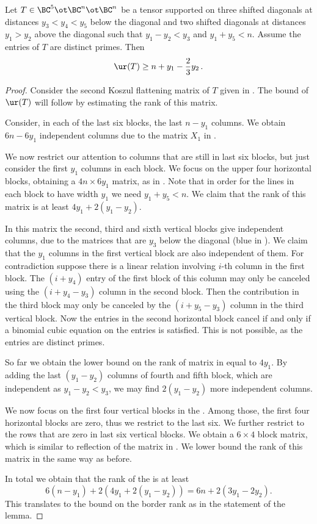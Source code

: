 \documentclass{toc}
\begin{document}
\begin{lemma}\label{primecase}
Let $T\in \BC^5\ot \BC^{n}\ot \BC^{n}$ be a tensor supported on 
three 
%
shifted 
diagonals at distances $y_3<y_4<y_5$ below the diagonal and two 
%
shifted 
diagonals
at distances $y_1>y_2$ above the diagonal such that $y_1-y_2<y_3$ and $y_1+y_5<n$.
Assume the entries of $T$ are distinct primes.
Then
$$
\ur(T)\geq n+y_1-\frac 23 y_2\,.
$$
\end{lemma}
\begin{proof}
Consider the second Koszul flattening matrix of $T$ given in . The bound of $\ur(T)$ will follow by estimating the rank of this matrix.
 
Consider,  in each of the last six blocks,
the last $n-y_1$ columns. We obtain $6n-6y_1$ independent columns  due to the matrix $X_1$ in
. 

We now restrict our attention to columns that are still in last six blocks, but
just consider the  first $y_1$ columns in each block. We focus on the upper four horizontal blocks, obtaining a $4n\times 6y_1$ matrix, as in . Note that in order for the lines in each block to have width $y_1$ we need  $y_1+y_5<n$. 
We claim that the rank of this matrix is at least $4y_1+2(y_1-y_2)$.

In this matrix the second, third and sixth vertical blocks give independent columns, due to the matrices that are $y_3$ below the diagonal (blue in ). We claim that the $y_1$ columns in the first vertical block are also independent of  them. For contradiction suppose there is a linear relation involving $i$-th column in the first block. The $(i+y_4)$ entry of the first block of this column may only be canceled using the $(i+y_4-y_3)$ column in the second block. Then the contribution in the third block may only be canceled by the $(i+y_5-y_3)$ column in the third vertical block. Now the entries in the second horizontal block cancel if and only if a binomial cubic equation on the entries is satisfied. This is not possible, as the entries are distinct primes. 

So far we obtain the lower bound on the rank of matrix in  equal to $4y_1$. By adding
the  last $(y_1-y_2)$ columns of fourth and fifth block, which are independent as $y_1-y_2<y_3$, we may find $2(y_1-y_2)$ more independent columns. 


We now focus on the first four vertical blocks in
the .  %
Among those,
the first four horizontal blocks are zero, thus we restrict to the last six. We further restrict to the rows that are zero in last six vertical blocks. We obtain a $6\times 4$ block matrix, which is similar to reflection of the matrix in . We lower bound  the rank of this matrix in 
the same way as before.

In total we obtain that the rank of
the  is at least  %
$$6(n-y_1)+2(4y_1+2(y_1-y_2))=6n+2(3y_1-2y_2).$$
This   translates to the bound on the border rank as in the statement of the lemma.
\end{proof}
\end{document}
